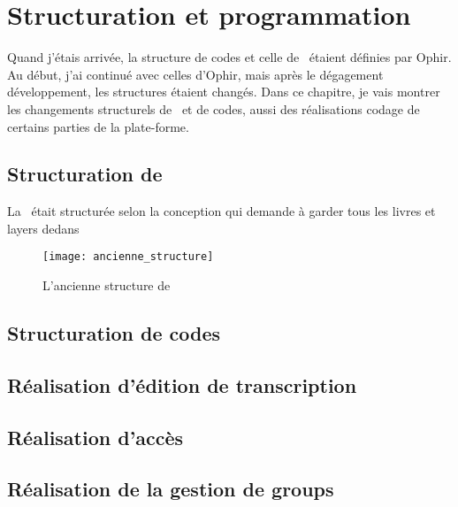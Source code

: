 \section{Structuration et programmation}

Quand j'étais arrivée, la structure de codes et celle de \db\ étaient définies par Ophir. Au début, j'ai continué avec celles d'Ophir, mais après le dégagement développement, les structures étaient changés. Dans ce chapitre, je vais montrer les changements structurels de \db\ et de codes, aussi des réalisations codage de certains parties de la plate-forme.

\subsection{Structuration de \db\ }

La \db\ était structurée selon la conception qui demande à garder tous les livres et layers dedans

\begin{figure}[H]
\centering
\texttt{[image: ancienne\_structure]}
\caption{L'ancienne structure de \db\ }
\end{figure}

\subsection{Structuration de codes}

\subsection{Réalisation d'édition de transcription}

\subsection{Réalisation d'accès}

\subsection{Réalisation de la gestion de groups}